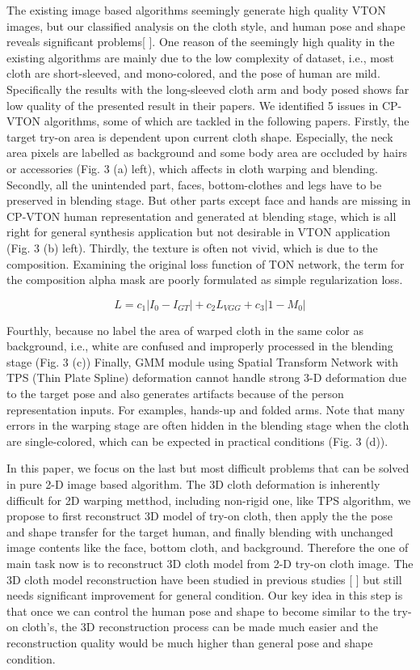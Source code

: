 \documentclass[runningheads]{llncs}
\begin{document}
The existing image based algorithms seemingly generate high quality VTON images, but our classified analysis on the cloth style, and human pose and shape reveals significant problems[  ]. One reason of the seemingly high quality in the existing algorithms are mainly due to the low complexity of dataset, i.e., most cloth are short-sleeved, and mono-colored, and the pose of human are mild. Specifically the results with the long-sleeved cloth arm and body posed shows far low quality of the presented result in their papers. We identified 5 issues in  CP-VTON algorithms, some of which are tackled in the following papers. Firstly, the target try-on area is dependent upon current cloth shape. Especially, the neck area pixels are labelled as background and some body area are occluded by hairs or accessories (Fig. 3 (a) left), which affects in cloth warping and blending.  Secondly, all the unintended part, faces, bottom-clothes and legs have to be preserved in blending stage. But other parts except face and hands are missing in CP-VTON human representation and generated at blending stage, which is all right for general synthesis application but not desirable in VTON application (Fig. 3 (b) left). Thirdly, the texture is often not vivid, which is due to the composition. Examining the original loss function of TON network, the term for the composition alpha mask are poorly formulated as simple regularization loss.   

\begin{equation}
L = c_1 | I_0-I_{GT} |+  c_2 L_{VGG}+c_3 |1-M_0 |        
 \end{equation} 

Fourthly, because no label the area of warped cloth in the same color as background, i.e., white are confused and improperly processed in the blending stage (Fig. 3 (c))
Finally, GMM module using Spatial Transform Network with TPS (Thin Plate Spline) deformation cannot handle strong 3-D deformation due to the target pose and also generates artifacts because of the person representation inputs. For examples, hands-up and folded arms.  Note that many errors in the warping stage are often hidden in the blending stage when the cloth are single-colored, which can be expected in practical conditions (Fig. 3 (d)).

In this paper, we focus on the last but most difficult problems that can be solved in pure 2-D image based algorithm. The 3D cloth deformation is inherently difficult for 2D warping metthod, including non-rigid one, like TPS algorithm, we propose to first reconstruct 3D model of try-on cloth, then apply the the pose and shape transfer for the target human, and finally blending with unchanged image contents like the face, bottom cloth, and background. Therefore the one of main task now is to reconstruct 3D cloth model from 2-D try-on cloth image. The 3D cloth model reconstruction have been studied in previous studies [    ] but still needs significant improvement for general condition. Our key idea in this step is that  once we can control the human pose and shape to become similar to the try-on cloth's, the 3D reconstruction process can be made much easier and the reconstruction quality would be much higher than general pose and shape condition. 
\end{document}
